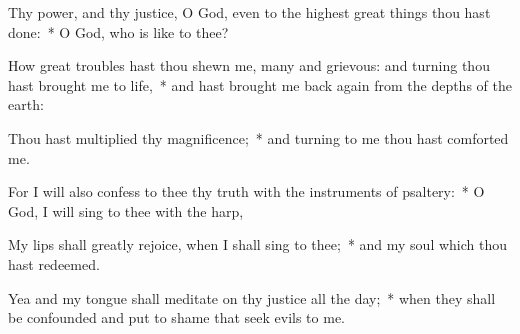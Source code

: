 \begin{enpars}
\item Thy power, and thy justice, O God, even to the highest great things thou hast done:~* O God, who is like to thee?
\item How great troubles hast thou shewn me, many and grievous: and turning thou hast brought me to life,~* and hast brought me back again from the depths of the earth:
\item Thou hast multiplied thy magnificence;~* and turning to me thou hast comforted me.
\item For I will also confess to thee thy truth with the instruments of psaltery:~* O God, I will sing to thee with the harp,
\item My lips shall greatly rejoice, when I shall sing to thee;~* and my soul which thou hast redeemed.
\item Yea and my tongue shall meditate on thy justice all the day;~* when they shall be confounded and put to shame that seek evils to me.
\end{enpars}